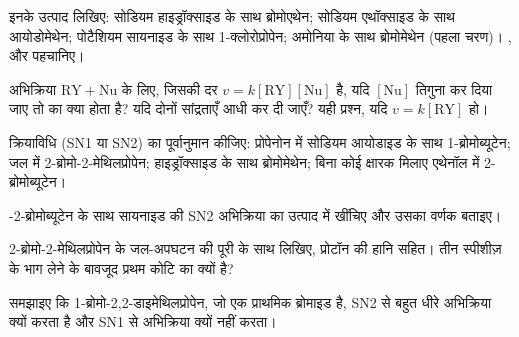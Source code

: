 \begin{exercise}[$\star$]\label{exo:b1:nucleophilic-substitution:1}
इनके उत्पाद लिखिए: सोडियम हाइड्रॉक्साइड के साथ ब्रोमोएथेन; सोडियम एथॉक्साइड के साथ
आयोडोमेथेन; पोटैशियम सायनाइड के साथ 1-क्लोरोप्रोपेन; अमोनिया के साथ
ब्रोमोमेथेन (पहला चरण)। ,  और  पहचानिए।
\end{exercise}

\begin{exercise}[$\star$]\label{exo:b1:nucleophilic-substitution:2}
अभिक्रिया $\mathrm{RY} + \mathrm{Nu}$ के लिए, जिसकी दर $v = k[\mathrm{RY}][\mathrm{Nu}]$ है,
यदि $[\mathrm{Nu}]$ तिगुना कर दिया जाए तो  का क्या होता है? यदि दोनों
सांद्रताएँ आधी कर दी जाएँ? यही प्रश्न, यदि $v = k[\mathrm{RY}]$ हो।
\end{exercise}

\begin{exercise}[$\star$]\label{exo:b1:nucleophilic-substitution:3}
क्रियाविधि (SN1 या SN2) का पूर्वानुमान कीजिए: प्रोपेनोन में सोडियम आयोडाइड के साथ
1-ब्रोमोब्यूटेन; जल में 2-ब्रोमो-2-मेथिलप्रोपेन; हाइड्रॉक्साइड के साथ ब्रोमोमेथेन;
बिना कोई क्षारक मिलाए एथेनॉल में 2-ब्रोमोब्यूटेन।
\end{exercise}

\begin{exercise}[$\star$]\label{exo:b1:nucleophilic-substitution:4}
-2-ब्रोमोब्यूटेन के साथ सायनाइड की SN2 अभिक्रिया का उत्पाद
 में खींचिए और उसका वर्णक बताइए।
\end{exercise}

\begin{exercise}[$\star\star$]\label{exo:b1:nucleophilic-substitution:5}
2-ब्रोमो-2-मेथिलप्रोपेन के जल-अपघटन की पूरी   के साथ लिखिए,
प्रोटॉन की हानि सहित। तीन स्पीशीज़ के भाग लेने के बावजूद 
प्रथम कोटि का क्यों है?
\end{exercise}

\begin{exercise}[$\star\star$]\label{exo:b1:nucleophilic-substitution:6}
समझाइए कि 1-ब्रोमो-2,2-डाइमेथिलप्रोपेन, जो एक प्राथमिक ब्रोमाइड है, SN2 से बहुत
धीरे अभिक्रिया क्यों करता है और SN1 से अभिक्रिया क्यों नहीं करता।
\end{exercise}

